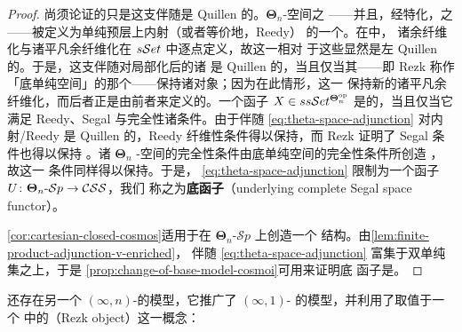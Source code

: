 \begin{proof}
尚须论证的只是这支伴随是 Quillen 的。$\boldsymbol{\Theta}_{n}$-空间之%
\trModelStructure——并且，经特化，\trCompleteSegalSpaces{}之%
\trModelStructure——被定义为单纯预层上内射（或者等价地，Reedy）%
\trModelStructure{}的一个\trBousfieldLocalization。在\trInjectiveModelStructure{}中，
诸余纤维化与诸平凡余纤维化在 $s\mathcal{S}et$ 中逐点定义，故这一\trLeftAdjoint{}相对
于这些\trModelStructure{}显然是左 Quillen 的。于是，这支伴随对局部化后的诸%
\trModelStructure{}是 Quillen 的，当且仅当其\trRightAdjoint{}——即 Rezk 称作
「底单纯空间」的那个\trFunctor——保持诸\trFibrant{}对象；因为在此情形，这一%
\trLeftAdjoint{}保持新的诸平凡余纤维化，而后者正是由前者来定义的。一个函子
$X\in ss\mathcal{S}et^{\boldsymbol{\Theta}_{n}^{\mathrm{op}}}$ 是\trFibrant{}的，当且仅当它
满足 Reedy、Segal 与完全性诸条件。由于伴随 \eqref{eq:theta-space-adjunction}
对内射/Reedy \trModelStructure{}是 Quillen 的，Reedy 纤维性条件得以保持，而
Rezk 证明了 Segal 条件也得以保持 \cite[7.2]{bib101}。诸 $\boldsymbol{\Theta}_{n}$%
-空间的完全性条件由底单纯空间的完全性条件所创造 \cite[\S7]{bib101}，故这一
条件同样得以保持。于是，\trRightAdjoint{} \eqref{eq:theta-space-adjunction}
限制为一个函子 $U\colon\boldsymbol{\Theta}_{n}\text{-}\mathcal{S}p\to\mathcal{C}\mathcal{S}\mathcal{S}$，我们
称之为\textbf{底\trCompleteSegalSpaces{}函子}（underlying complete Segal
space functor）。

\cref{cor:cartesian-closed-cosmos}适用于在
$\boldsymbol{\Theta}_{n}\text{-}\mathcal{S}p$ 上创造一个\trCartesianClosed{}%
\trInfinityCosmos{}结构。由\cref{lem:finite-product-adjunction-v-enriched}，
伴随 \eqref{eq:theta-space-adjunction} 富集于双单纯集之上，于是
\cref{prop:change-of-base-model-cosmoi}可用来证明底\trCompleteSegalSpaces{}%
函子是\trCosmological。
\end{proof}

还存在另一个 $(\infty,n)$-\trCategory{}的模型，它推广了 $(\infty,1)$-%
\trCategory{}的\trCompleteSegalSpaces{}模型，并利用了取值于一个\trModelCategory{}%
中的\textbf{\trRezkObject}（Rezk object）这一概念：

